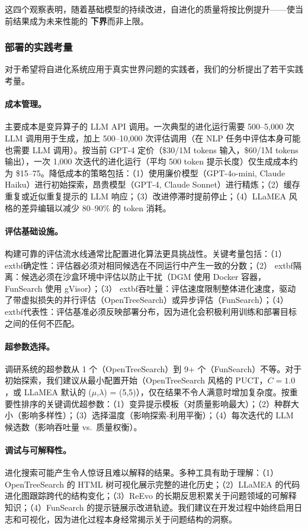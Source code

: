 这四个观察表明，随着基础模型的持续改进，自进化的质量将按比例提升——使当前结果成为未来性能的 \textbf{下界}而非上限。


\subsubsection{部署的实践考量}

对于希望将自进化系统应用于真实世界问题的实践者，我们的分析提出了若干实践考量。

\paragraph{成本管理。}
主要成本是变异算子的 LLM API 调用。一次典型的进化运行需要 500--5,000 次 LLM 调用用于生成，加上 500--10,000 次评估调用（在 NLP 任务中评估本身可能也需要 LLM 调用）。按当前 GPT-4 定价（\$30/1M tokens 输入，\$60/1M tokens 输出），一次 1,000 次迭代的进化运行（平均 500 token 提示长度）仅生成成本约为 \$15--75。降低成本的策略包括：（1）使用廉价模型（GPT-4o-mini, Claude Haiku）进行初始探索，昂贵模型（GPT-4, Claude Sonnet）进行精炼；（2）缓存重复或近似重复提示的 LLM 响应；（3）改进停滞时提前停止；（4）LLaMEA 风格的差异编辑以减少 80--90\% 的 token 消耗。

\paragraph{评估基础设施。}
构建可靠的评估流水线通常比配置进化算法更具挑战性。关键考量包括：（1）	extbf{确定性}：评估器必须对相同候选在不同运行中产生一致的分数；（2）	extbf{隔离}：候选必须在沙盒环境中评估以防止干扰（DGM 使用 Docker 容器，FunSearch 使用 gVisor）；（3）	extbf{吞吐量}：评估速度限制整体进化速度，驱动了带虚拟损失的并行评估（OpenTreeSearch）或异步评估（FunSearch）；（4）	extbf{代表性}：评估基准必须反映部署分布，因为进化会积极利用训练和部署目标之间的任何不匹配。

\paragraph{超参数选择。}
调研系统的超参数从 1 个（OpenTreeSearch）到 9+ 个（FunSearch）不等。对于初始探索，我们建议从最小配置开始（OpenTreeSearch 风格的 PUCT，$C=1.0$，或 LLaMEA 默认的 ($\mu$,$\lambda$) = (5,5)），仅在结果不令人满意时增加复杂度。按重要性排序的关键调优超参数：（1）变异提示模板（对质量影响最大）；（2）种群大小（影响多样性）；（3）选择温度（影响探索-利用平衡）；（4）每次迭代的 LLM 候选数（影响吞吐量 vs.\ 质量权衡）。

\paragraph{调试与可解释性。}
进化搜索可能产生令人惊讶且难以解释的结果。多种工具有助于理解：（1）OpenTreeSearch 的 HTML 树可视化展示完整的进化历史；（2）LLaMEA 的代码进化图跟踪跨代的结构变化；（3）ReEvo 的长期反思积累关于问题领域的可解释知识；（4）FunSearch 的提示链展示改进轨迹。我们建议在开发过程中始终启用日志和可视化，因为进化过程本身经常揭示关于问题结构的洞察。


